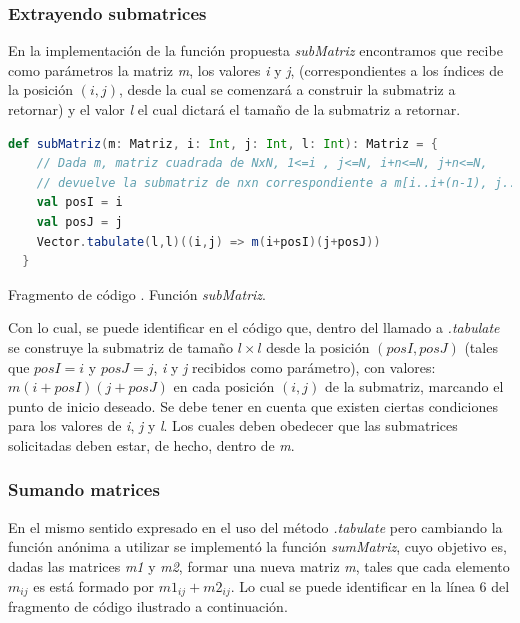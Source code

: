 \documentclass{article}
\newcounter{codesnippet}
\newcommand{\newcodesnippet}{%
  \stepcounter{codesnippet}%
}
\begin{document}
\subsubsection{Extrayendo submatrices}

En la implementación de la función propuesta \textit{subMatriz} encontramos que recibe como parámetros la matriz \textit{m}, los valores \textit{i} y \textit{j}, (correspondientes a los índices de la posición \((i,j)\), desde la cual se comenzará a construir la submatriz a retornar) y el valor \textit{l} el cual dictará el tamaño de la submatriz a retornar. 

\newcodesnippet
\begin{lstlisting}[language=Scala]
  def subMatriz(m: Matriz, i: Int, j: Int, l: Int): Matriz = {
    // Dada m, matriz cuadrada de NxN, 1<=i , j<=N, i+n<=N, j+n<=N,
    // devuelve la submatriz de nxn correspondiente a m[i..i+(n-1), j..j+(n-1)]
    val posI = i
    val posJ = j
    Vector.tabulate(l,l)((i,j) => m(i+posI)(j+posJ))
  }
\end{lstlisting}
\begin{center}
    \small{Fragmento de código \thecodesnippet. Función \textit{subMatriz}.}
\end{center}

Con lo cual, se puede identificar en el código que, dentro del llamado a \textit{.tabulate} se construye la submatriz de tamaño \(l \times l\) desde la posición \((posI, posJ)\) (tales que \(posI = i\) y \(posJ = j\), \textit{i} y \textit{j} recibidos como parámetro), con valores: \(m(i + posI)(j + posJ)\) en cada posición \((i,j)\) de la submatriz, marcando el punto de inicio deseado. Se debe tener en cuenta que existen ciertas condiciones para los valores de \textit{i}, \textit{j} y \textit{l}. Los cuales deben obedecer que las submatrices solicitadas deben estar, de hecho, dentro de \textit{m}.

\subsubsection{Sumando matrices}

En el mismo sentido expresado en el uso del método \textit{.tabulate} pero cambiando la función anónima a utilizar se implementó la función \textit{sumMatriz}, cuyo objetivo es, dadas las matrices \textit{m1} y \textit{m2}, formar una nueva matriz \textit{m}, tales que cada elemento \(m_{ij}\) es está formado por \(m1_{ij} + m2_{ij}\). Lo cual se puede identificar en la línea 6 del fragmento de código ilustrado a continuación.\\
\end{document}
